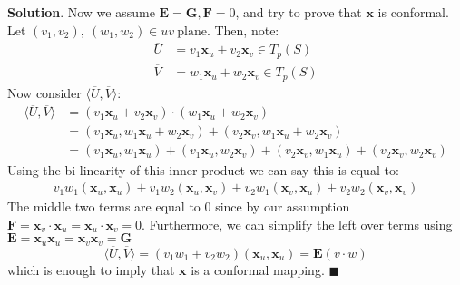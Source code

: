 \documentclass[12pt]{article}
\renewcommand{\=}[1]{\stackrel{#1}{=}} %
\theoremstyle{definition}
\newenvironment{s}{%
        \begin{trivlist} \item \textbf{Solution}. }{%
            \hspace*{\fill} $\blacksquare$\end{trivlist}}%
\begin{document}
\begin{s}
    Now we assume $\mathbf{E} = \mathbf{G}, \mathbf{F} = 0$, and try to prove that $\mathbf{x}$ is conformal.
    Let $(v_1,v_2),\:(w_1,w_2)\in uv\:\text{plane}$. Then, note:
    \begin{align*}
        \overline{U} &= v_1\mathbf{x}_u + v_2\mathbf{x}_v \in T_p(S) \\
        \overline{V} &= w_1\mathbf{x}_u + w_2\mathbf{x}_v \in T_p(S)
    \end{align*}
    Now consider $\langle \overline{U}, \overline{V}\rangle$:
    \begin{align*}
        \langle \overline{U}, \overline{V} \rangle &= (v_1\mathbf{x}_u + v_2\mathbf{x}_v)\cdot(w_1\mathbf{x}_u+w_2\mathbf{x}_v) \\
        &= (v_1\mathbf{x}_u, w_1\mathbf{x}_u + w_2\mathbf{x}_v) + (v_2\mathbf{x}_v, w_1\mathbf{x}_u + w_2\mathbf{x}_v) \\
        &= (v_1\mathbf{x}_u, w_1\mathbf{x}_u) + (v_1\mathbf{x}_u, w_2\mathbf{x}_v) + (v_2\mathbf{x}_v, w_1\mathbf{x}_u) + (v_2\mathbf{x}_v, w_2\mathbf{x}_v)
    \end{align*}
    Using the bi-linearity of this inner product we can say this is equal to:
    \begin{align*}
        v_1w_1(\mathbf{x}_u,\mathbf{x}_u) + v_1w_2(\mathbf{x}_u,\mathbf{x}_v) + v_2w_1(\mathbf{x}_v,\mathbf{x}_u) + v_2w_2(\mathbf{x}_v,\mathbf{x}_v)
    \end{align*}
    The middle two terms are equal to 0 since by our assumption $\mathbf{F} = \mathbf{x}_v\cdot\mathbf{x}_u = \mathbf{x}_u\cdot\mathbf{x}_v = 0$.
    Furthermore, we can simplify the left over terms using $\mathbf{E} = \mathbf{x}_u\mathbf{x}_u = \mathbf{x}_v\mathbf{x}_v = \mathbf{G}$
    \[ \langle \overline{U}, \overline{V} \rangle = (v_1w_1 + v_2w_2)(\mathbf{x}_u,\mathbf{x}_u) = \mathbf{E}(v\cdot w) \]
    which is enough to imply that $\mathbf{x}$ is a conformal mapping.
\end{s}
\end{document}
